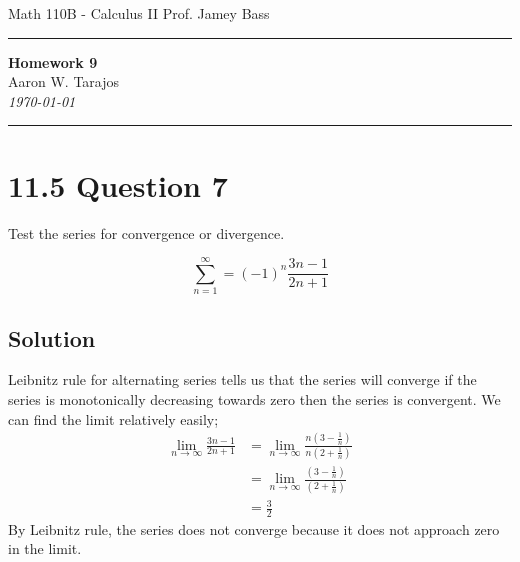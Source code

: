 \documentclass{article}
\begin{document}
\noindent
Math 110B - Calculus II  \hfill Prof. Jamey Bass

\noindent\rule{\textwidth}{0.4pt}

\begin{center}
    \textbf{\LARGE Homework 9} \\
    \vspace{12pt}
    \large Aaron W. Tarajos \\
    \textit{\today}
\end{center}

\noindent\rule{\textwidth}{0.4pt}

\section*{11.5 Question 7}
Test the series for convergence or divergence.

\[
	\sum_{n=1}^\infty = (-1)^n \frac{3n-1}{2n+1}
\]

\subsection*{Solution}
Leibnitz rule for alternating series tells us that the series will converge if the series is monotonically decreasing towards zero then the series is convergent. We can find the limit relatively easily;
\begin{align*}
	\lim_{n \to \infty} \frac{3n-1}{2n+1} &= \lim_{n \to \infty} \frac{n\left( 3 - \frac{1}{n}\right)}{n \left( 2 + \frac{1}{n} \right)} \\
					      &= \lim_{n \to \infty} \frac{\left( 3 - \frac{1}{n}\right)}{\left( 2 + \frac{1}{n} \right)} \\
					      &= \frac{3}{2}
\end{align*}
By Leibnitz rule, the series does not converge because it does not approach zero in the limit.
\end{document}
